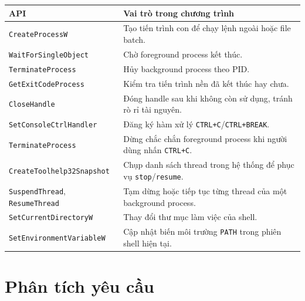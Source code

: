 \documentclass[13pt,a4paper,oneside]{extreport}
\begin{document}
\begin{longtable}{|p{4.2cm}|p{10.3cm}|}
	\hline
	\textbf{API}                                  & \textbf{Vai trò trong chương trình}                                            \\
	\hline
	\texttt{CreateProcessW}                       & Tạo tiến trình con để chạy lệnh ngoài hoặc file batch.                         \\
	\hline
	\texttt{WaitForSingleObject}                  & Chờ foreground process kết thúc.                                               \\
	\hline
	\texttt{TerminateProcess}                     & Hủy background process theo PID.                                               \\
	\hline
	\texttt{GetExitCodeProcess}                   & Kiểm tra tiến trình nền đã kết thúc hay chưa.                                  \\
	\hline
	\texttt{CloseHandle}                          & Đóng handle sau khi không còn sử dụng, tránh rò rỉ tài nguyên.                 \\
	\hline
	\texttt{SetConsoleCtrlHandler}                & Đăng ký hàm xử lý \texttt{CTRL+C}/\texttt{CTRL+BREAK}.                         \\
	\hline
	\texttt{TerminateProcess}                     & Dừng chắc chắn foreground process khi người dùng nhấn \texttt{CTRL+C}.          \\
	\hline
	\texttt{CreateToolhelp32Snapshot}             & Chụp danh sách thread trong hệ thống để phục vụ \texttt{stop}/\texttt{resume}. \\
	\hline
	\texttt{SuspendThread}, \texttt{ResumeThread} & Tạm dừng hoặc tiếp tục từng thread của một background process.                 \\
	\hline
	\texttt{SetCurrentDirectoryW}                 & Thay đổi thư mục làm việc của shell.                                           \\
	\hline
	\texttt{SetEnvironmentVariableW}              & Cập nhật biến môi trường \texttt{PATH} trong phiên shell hiện tại.             \\
	\hline
\end{longtable}

\chapter{Phân tích yêu cầu}
\end{document}
